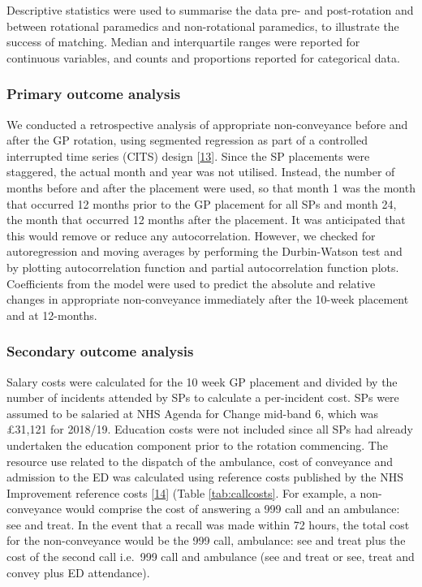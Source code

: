 \documentclass[
  a4paper,
  openany]{article}
\begin{document}
Descriptive statistics were used to summarise the data pre- and post-rotation and between rotational paramedics and non-rotational paramedics, to illustrate the success of matching. Median and interquartile ranges were reported for continuous variables, and counts and proportions reported for categorical data.

\hypertarget{primary-outcome-analysis}{%
\subsubsection*{Primary outcome analysis}\label{primary-outcome-analysis}}

We conducted a retrospective analysis of appropriate non-conveyance before and after the GP rotation, using segmented regression as part of a controlled interrupted time series (CITS) design {[}\protect\hyperlink{ref-penfold_use_2013}{13}{]}. Since the SP placements were staggered, the actual month and year was not utilised. Instead, the number of months before and after the placement were used, so that month 1 was the month that occurred 12 months prior to the GP placement for all SPs and month 24, the month that occurred 12 months after the placement. It was anticipated that this would remove or reduce any autocorrelation. However, we checked for autoregression and moving averages by performing the Durbin-Watson test and by plotting autocorrelation function and partial autocorrelation function plots. Coefficients from the model were used to predict the absolute and relative changes in appropriate non-conveyance immediately after the 10-week placement and at 12-months.

\hypertarget{secondary-outcome-analysis}{%
\subsubsection*{Secondary outcome analysis}\label{secondary-outcome-analysis}}

Salary costs were calculated for the 10 week GP placement and divided by the number of incidents attended by SPs to calculate a per-incident cost. SPs were assumed to be salaried at NHS Agenda for Change mid-band 6, which was £31,121 for 2018/19. Education costs were not included since all SPs had already undertaken the education component prior to the rotation commencing. The resource use related to the dispatch of the ambulance, cost of conveyance and admission to the ED was calculated using reference costs published by the NHS Improvement reference costs {[}\protect\hyperlink{ref-nhs_improvement_reference_2018}{14}{]} (Table \ref{tab:callcosts}. For example, a non-conveyance would comprise the cost of answering a 999 call and an ambulance: see and treat. In the event that a recall was made within 72 hours, the total cost for the non-conveyance would be the 999 call, ambulance: see and treat plus the cost of the second call i.e.~999 call and ambulance (see and treat or see, treat and convey plus ED attendance).
\end{document}
